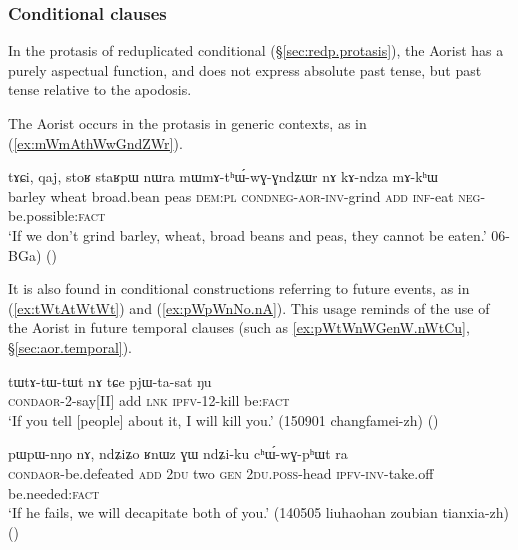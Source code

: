 \subsubsection{Conditional clauses }   \label{sec:aor.cond}
In the protasis of reduplicated conditional (§\ref{sec:redp.protasis}), the Aorist has a purely aspectual function, and does not express absolute past tense, but past tense relative to the apodosis.

The Aorist occurs in the protasis in generic contexts, as in (\ref{ex:mWmAthWwGndZWr}).

\begin{exe}
\ex \label{ex:mWmAthWwGndZWr}
 \gll tɤɕi, qaj, stoʁ staʁpɯ nɯra mɯ\redp{}mɤ-tʰɯ́-wɣ-ɣndʑɯr nɤ kɤ-ndza mɤ-kʰɯ \\
 barley wheat broad.bean peas \textsc{dem}:\textsc{pl} \textsc{cond}\redp{}\textsc{neg}-\textsc{aor}-\textsc{inv}-grind \textsc{add} \textsc{inf}-eat \textsc{neg}-be.possible:\textsc{fact} \\
 \glt `If we don't grind barley, wheat, broad beans and peas, they cannot be eaten.' 06-BGa)
()
\end{exe}

It is also found in conditional constructions referring to future events, as in (\ref{ex:tWtAtWtWt}) and (\ref{ex:pWpWnNo.nA}). This usage reminds of the use of the Aorist in future temporal clauses (such as \ref{ex:pWtWnWGenW.nWtCu}, §\ref{sec:aor.temporal}).

\begin{exe}
\ex \label{ex:tWtAtWtWt}
 \gll  tɯ\redp{}tɤ-tɯ-tɯt nɤ tɕe pjɯ-ta-sat ŋu \\
 \textsc{cond}\redp{}\textsc{aor}-2-say[II] add \textsc{lnk} \textsc{ipfv}-1\fl{}2-kill be:\textsc{fact} \\
 \glt `If you tell [people] about it, I will kill you.' (150901 changfamei-zh) ()
\end{exe}
 
\begin{exe}
\ex \label{ex:pWpWnNo.nA}
\gll pɯ\redp{}pɯ-nŋo nɤ, ndʑiʑo ʁnɯz ɣɯ ndʑi-ku cʰɯ́-wɣ-pʰɯt ra \\
 \textsc{cond}\redp{}\textsc{aor}-be.defeated \textsc{add} \textsc{2du} two \textsc{gen} \textsc{2du}.\textsc{poss}-head \textsc{ipfv}-\textsc{inv}-take.off be.needed:\textsc{fact} \\
 \glt `If he fails, we will decapitate both of you.' (140505 liuhaohan zoubian tianxia-zh)
()
\end{exe}

